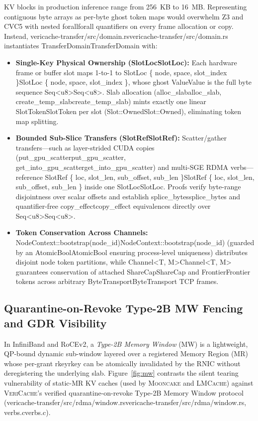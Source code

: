 \documentclass[11pt,a4paper]{article}
\let\origunderscore\_
\DeclareRobustCommand{\code}[1]{{\ttfamily\ifmmode #1\else\def\_{\origunderscore\hspace{0pt}}#1\fi}}
\newcommand{\VC}{\textsc{VeriCache}}
\newcommand{\MC}{\textsc{Mooncake}}
\newcommand{\LM}{\textsc{LMCache}}
\begin{document}
KV blocks in production inference range from 256~KB to 16~MB. Representing contiguous byte arrays as per-byte ghost token maps would overwhelm Z3 and CVC5 with nested \code{forall} quantifiers on every frame allocation or copy. Instead, \code{vericache-transfer/src/domain.rs} instantiates \code{TransferDomain} with:
\begin{itemize}
  \item \textbf{Single-Key Physical Ownership (\code{SlotLoc}):} Each hardware frame or buffer slot maps 1-to-1 to \code{SlotLoc \{ node, space, slot\_index \}}, whose ghost \code{Value} is the full byte sequence \code{Seq<u8>}. Slab allocation (\code{alloc\_slab}, \code{create\_temp\_slab}) mints exactly one linear \code{SlotToken} per slot (\code{Slot::Owned}), eliminating token map splitting.
  \item \textbf{Bounded Sub-Slice Transfers (\code{SlotRef}):} Scatter/gather transfers---such as layer-strided CUDA copies (\code{put\_gpu\_scatter}, \code{get\_into\_gpu\_scatter}) and multi-SGE RDMA verbs---reference \code{SlotRef \{ loc, slot\_len, sub\_offset, sub\_len \}} inside one \code{SlotLoc}. Proofs verify byte-range disjointness over scalar offsets and establish \code{splice\_bytes} and quantifier-free \code{copy\_effect} equivalences directly over \code{Seq<u8>}.
  \item \textbf{Token Conservation Across Channels:} \code{NodeContext::bootstrap(node\_id)} (guarded by an \code{AtomicBool} ensuring process-level uniqueness) distributes disjoint node token partitions, while \code{Channel<T, M>} guarantees conservation of attached \code{ShareCap} and \code{Frontier} tokens across arbitrary \code{ByteTransport} TCP frames.
\end{itemize}

\subsection{Quarantine-on-Revoke Type-2B MW Fencing and GDR Visibility}

In InfiniBand and RoCEv2, a \emph{Type-2B Memory Window} (MW) is a lightweight, QP-bound dynamic sub-window layered over a registered Memory Region (MR) whose per-grant \code{rkey} can be atomically invalidated by the RNIC without deregistering the underlying slab. Figure~\ref{fig:mw} contrasts the silent tearing vulnerability of static-MR KV caches (used by \MC{} and \LM{}) against \VC{}'s verified quarantine-on-revoke Type-2B Memory Window protocol (\code{vericache-transfer/src/rdma/window.rs}, \code{verbs.c}).
\end{document}
